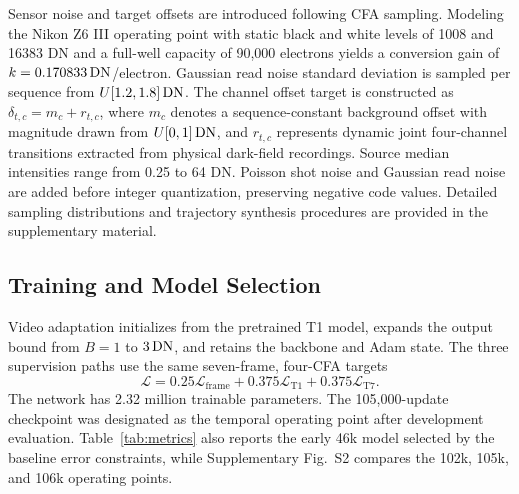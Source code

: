Sensor noise and target offsets are introduced following CFA sampling. Modeling the Nikon Z6 III operating point with static black and white levels of 1008 and 16383 DN and a full-well capacity of 90,000 electrons yields a conversion gain of $k=0.170833\,\mathrm{DN}$/electron. Gaussian read noise standard deviation is sampled per sequence from $U[1.2,1.8]\,\mathrm{DN}$. The channel offset target is constructed as $\delta_{t,c}=m_c+r_{t,c}$, where $m_c$ denotes a sequence-constant background offset with magnitude drawn from $U[0,1]\,\mathrm{DN}$, and $r_{t,c}$ represents dynamic joint four-channel transitions extracted from physical dark-field recordings. Source median intensities range from 0.25 to 64 DN. Poisson shot noise and Gaussian read noise are added before integer quantization, preserving negative code values. Detailed sampling distributions and trajectory synthesis procedures are provided in the supplementary material.

\subsection{Training and Model Selection}
Video adaptation initializes from the pretrained T1 model, expands the output bound from $B=1$ to $3\,\mathrm{DN}$, and retains the backbone and Adam state. The three supervision paths use the same seven-frame, four-CFA targets
\begin{equation}
 \mathcal L=0.25\mathcal L_{\mathrm{frame}}
          +0.375\mathcal L_{\mathrm{T1}}
          +0.375\mathcal L_{\mathrm{T7}}.
 \label{eq:training}
\end{equation}
The network has 2.32 million trainable parameters. The 105,000-update checkpoint was designated as the temporal operating point after development evaluation. Table~\ref{tab:metrics} also reports the early 46k model selected by the baseline error constraints, while Supplementary Fig.~S2 compares the 102k, 105k, and 106k operating points.



